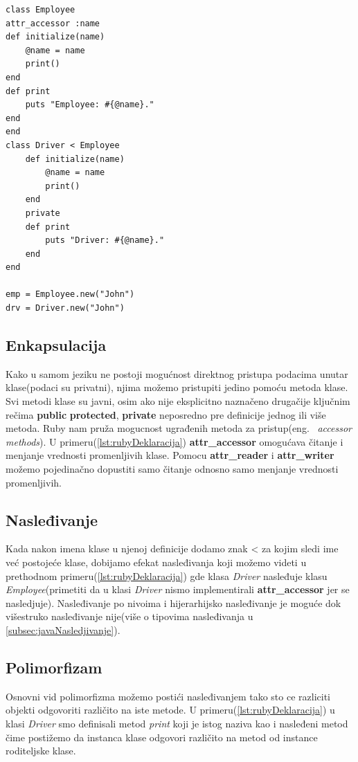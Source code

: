 \documentclass[a4paper]{article}
\begin{document}
\begin{lstlisting}[caption={Primer objektno orijentisanog programiranja u jeziku Ruby.},frame=single, label=lst:rubyDeklaracija]
class Employee
attr_accessor :name
def initialize(name)
	@name = name
	print()
end
def print
	puts "Employee: #{@name}."
end
end
class Driver < Employee
	def initialize(name)
		@name = name
		print()
	end
	private
	def print
		puts "Driver: #{@name}."
	end
end

emp = Employee.new("John")
drv = Driver.new("John")
\end{lstlisting}

\subsection{Enkapsulacija}
\label{subsec:rubyEnkapsulacija}
Kako u samom jeziku ne postoji mogućnost direktnog pristupa podacima unutar klase(podaci su privatni), njima možemo pristupiti jedino pomoću metoda klase. Svi metodi klase su javni, osim ako nije eksplicitno naznačeno drugačije ključnim rečima \textbf{public} \textbf{protected}, \textbf{private} neposredno pre definicije jednog ili više metoda. Ruby nam pruža mogucnost ugrađenih metoda za pristup(eng. ~{\em accessor methods}). U primeru(\ref{lst:rubyDeklaracija})  \textbf{attr\_accessor} omogućava čitanje i menjanje vrednosti promenljivih klase. Pomocu \textbf{attr\_reader} i \textbf{attr\_writer} možemo pojedinačno dopustiti samo čitanje odnosno samo menjanje vrednosti promenljivih.

\subsection{Nasleđivanje}
\label{subsec:rubyNasledjivanje}
Kada nakon imena klase u njenoj definicije dodamo znak < za kojim sledi ime već postojeće klase, dobijamo efekat nasleđivanja koji možemo videti u prethodnom primeru(\ref{lst:rubyDeklaracija}) gde klasa \textit{Driver} nasleđuje klasu \textit{Employee}(primetiti da u klasi \textit{Driver} nismo implementirali \textbf{attr\_accessor} jer se nasledjuje). Nasleđivanje po nivoima i hijerarhijsko nasleđivanje je moguće dok višestruko nasleđivanje nije(više o tipovima nasleđivanja u \ref{subsec:javaNasledjivanje}).

\subsection{Polimorfizam}
\label{subsec:rubyPolimorfizam}
Osnovni vid polimorfizma možemo postići nasleđivanjem tako sto ce razliciti objekti odgovoriti različito na iste metode. U primeru(\ref{lst:rubyDeklaracija}) u klasi \textit{Driver} smo definisali metod \textit{print} koji je istog naziva kao i nasleđeni metod čime postižemo da instanca klase odgovori različito na metod od instance roditeljske klase. 
\end{document}
